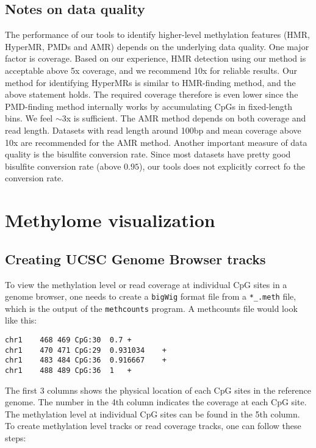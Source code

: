 \documentclass[10pt]{article}
\newcommand{\prog}[1]{\texttt{#1}}
\newcommand{\fn}[1]{\texttt{#1}}
\newcommand{\lit}[1]{\texttt{#1}}
\begin{document}
{{\subsection{Notes on data quality}
\label{sec:notes-data-quality}
The performance of our tools to identify higher-level methylation
features (HMR, HyperMR, PMDs and AMR) depends on the underlying data
quality. One major factor is coverage. Based on our experience, HMR
detection using our method is acceptable above 5x coverage, and we
recommend 10x for reliable results. Our method for identifying
HyperMRs is similar to HMR-finding method, and the above statement
holds. The required coverage therefore is even lower since the
PMD-finding method internally works by accumulating CpGs in
fixed-length bins. We feel $\sim$3x is sufficient. The AMR method
depends on both coverage and read length. Datasets with read length
around 100bp and mean coverage above 10x are recommended for the AMR
method. Another important measure of data quality is the bisulfite
conversion rate. Since most datasets have pretty good bisulfite
conversion rate (above $0.95$), our tools does not explicitly correct
fo the conversion rate.

\section{Methylome visualization}
\label{sec:visualization}


\subsection{Creating UCSC Genome Browser tracks}
\label{sec:browser}

To view the methylation level or read coverage at individual CpG sites
in a genome browser, one needs to create a \lit{bigWig} format file
from a \fn{*\_.meth} file, which is the output of the \prog{methcounts}
program. A methcounts file would look like this:

\begin{verbatim}
chr1	468	469	CpG:30	0.7	+
chr1	470	471	CpG:29	0.931034	+
chr1	483	484	CpG:36	0.916667	+
chr1	488	489	CpG:36	1	+
\end{verbatim}

The first 3 columns shows the physical location of each CpG sites in
the reference genome. The number in the 4th column indicates the
coverage at each CpG site. The methylation level at individual CpG
sites can be found in the 5th column. To create methylation level
tracks or read coverage tracks, one can follow these steps:

}}
\end{document}
